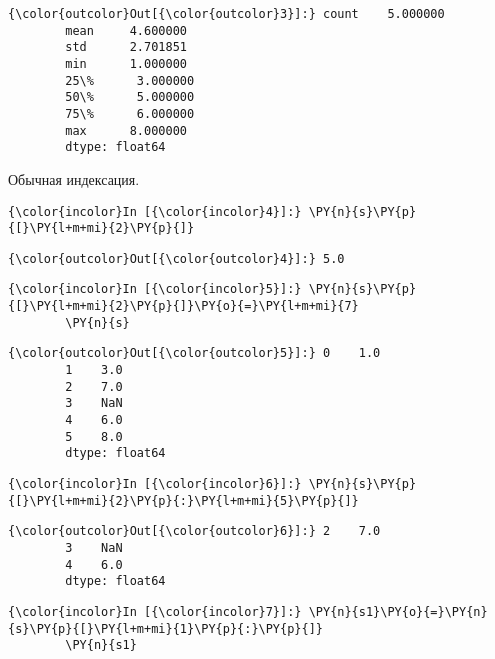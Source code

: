             \begin{Verbatim}[commandchars=\\\{\}]
{\color{outcolor}Out[{\color{outcolor}3}]:} count    5.000000
        mean     4.600000
        std      2.701851
        min      1.000000
        25\%      3.000000
        50\%      5.000000
        75\%      6.000000
        max      8.000000
        dtype: float64
\end{Verbatim}
        
    Обычная индексация.

    \begin{Verbatim}[commandchars=\\\{\}]
{\color{incolor}In [{\color{incolor}4}]:} \PY{n}{s}\PY{p}{[}\PY{l+m+mi}{2}\PY{p}{]}
\end{Verbatim}

            \begin{Verbatim}[commandchars=\\\{\}]
{\color{outcolor}Out[{\color{outcolor}4}]:} 5.0
\end{Verbatim}
        
    \begin{Verbatim}[commandchars=\\\{\}]
{\color{incolor}In [{\color{incolor}5}]:} \PY{n}{s}\PY{p}{[}\PY{l+m+mi}{2}\PY{p}{]}\PY{o}{=}\PY{l+m+mi}{7}
        \PY{n}{s}
\end{Verbatim}

            \begin{Verbatim}[commandchars=\\\{\}]
{\color{outcolor}Out[{\color{outcolor}5}]:} 0    1.0
        1    3.0
        2    7.0
        3    NaN
        4    6.0
        5    8.0
        dtype: float64
\end{Verbatim}
        
    \begin{Verbatim}[commandchars=\\\{\}]
{\color{incolor}In [{\color{incolor}6}]:} \PY{n}{s}\PY{p}{[}\PY{l+m+mi}{2}\PY{p}{:}\PY{l+m+mi}{5}\PY{p}{]}
\end{Verbatim}

            \begin{Verbatim}[commandchars=\\\{\}]
{\color{outcolor}Out[{\color{outcolor}6}]:} 2    7.0
        3    NaN
        4    6.0
        dtype: float64
\end{Verbatim}
        
    \begin{Verbatim}[commandchars=\\\{\}]
{\color{incolor}In [{\color{incolor}7}]:} \PY{n}{s1}\PY{o}{=}\PY{n}{s}\PY{p}{[}\PY{l+m+mi}{1}\PY{p}{:}\PY{p}{]}
        \PY{n}{s1}
\end{Verbatim}

